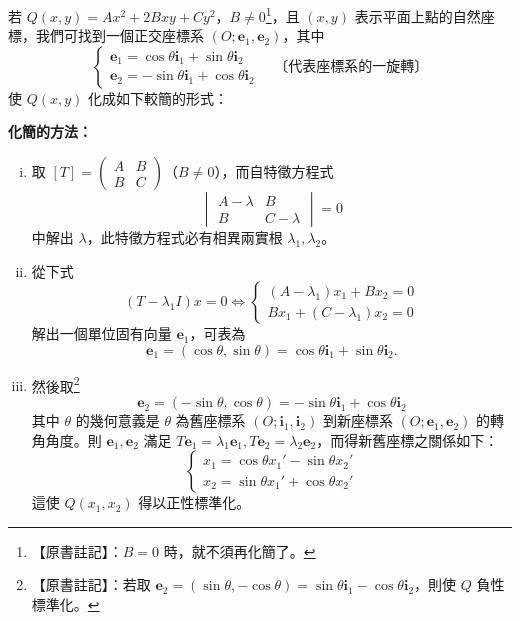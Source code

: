 若 $Q(x, y) = Ax^2 + 2Bxy + Cy^2$，$B \ne 0$\label{note:b4-ch4-b-zero}\footnote{【原書註記】：$B = 0$ 時，就不須再化簡了。}，且 $(x, y)$ 表示平面上點的自然座標，我們可找到一個正交座標系 $(O; \mathbf{e}_1, \mathbf{e}_2)$，其中
\[
\begin{cases}
\mathbf{e}_1 = \cos\theta \mathbf{i}_1 + \sin\theta \mathbf{i}_2 \\
\mathbf{e}_2 = -\sin\theta \mathbf{i}_1 + \cos\theta \mathbf{i}_2
\end{cases}
\quad \text{〔代表座標系的一旋轉〕}
\]
使 $Q(x, y)$ 化成如下較簡的形式：
\begin{center}
\textbf{化簡的方法：}
\end{center}
\begin{enumerate}[(i)]
  \item 取 $[T] = \begin{pmatrix} A & B \\ B & C \end{pmatrix}$（$B \ne 0$），而自特徵方程式
  \[
  \begin{vmatrix} A - \lambda & B \\ B & C - \lambda \end{vmatrix} = 0
  \]
  中解出 $\lambda$，此特徵方程式必有相異兩實根 $\lambda_1, \lambda_2$。
  
  \item 從下式
  \[
  (T - \lambda_1 I)x = 0 \iff
  \begin{cases}
  (A - \lambda_1)x_1 + Bx_2 = 0 \\
  Bx_1 + (C - \lambda_1)x_2 = 0
  \end{cases}
  \]
  解出一個單位固有向量 $\mathbf{e}_1$，可表為
  \[
  \mathbf{e}_1 = (\cos\theta, \sin\theta) = \cos\theta \mathbf{i}_1 + \sin\theta \mathbf{i}_2.
  \]
  
  \item 然後取\label{note:b4-ch4-e2-choice}\footnote{【原書註記】：若取 $\mathbf{e}_2 = (\sin\theta, -\cos\theta) = \sin\theta \mathbf{i}_1 - \cos\theta \mathbf{i}_2$，則使 $Q$ 負性標準化。}
  \[
  \mathbf{e}_2 = (-\sin\theta, \cos\theta) = -\sin\theta \mathbf{i}_1 + \cos\theta \mathbf{i}_2
  \]
  其中 $\theta$ 的幾何意義是 $\theta$ 為舊座標系 $(O; \mathbf{i}_1, \mathbf{i}_2)$ 到新座標系 $(O; \mathbf{e}_1, \mathbf{e}_2)$ 的轉角角度。則 $\mathbf{e}_1, \mathbf{e}_2$ 滿足 $T\mathbf{e}_1 = \lambda_1 \mathbf{e}_1, T\mathbf{e}_2 = \lambda_2 \mathbf{e}_2$，而得新舊座標之關係如下：
  \[
  \begin{cases}
  x_1 = \cos\theta x_1' - \sin\theta x_2' \\
  x_2 = \sin\theta x_1' + \cos\theta x_2'
  \end{cases}
  \]
  這使 $Q(x_1, x_2)$ 得以正性標準化。
\end{enumerate}

